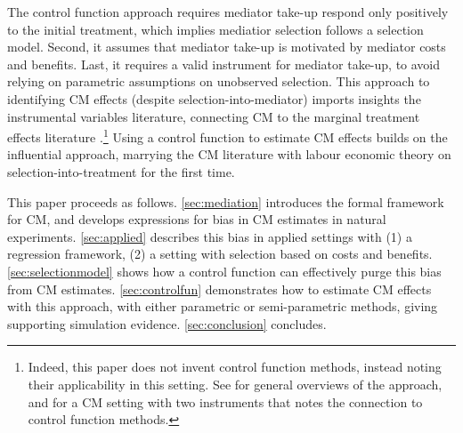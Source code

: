 The control function approach requires mediator take-up respond only positively to the initial treatment, which implies mediatior selection follows a selection model.
Second, it assumes that mediator take-up is motivated by mediator costs and benefits.
Last, it requires a valid instrument for mediator take-up, to avoid relying on parametric assumptions on unobserved selection.
This approach to identifying CM effects (despite selection-into-mediator) imports insights the instrumental variables literature, connecting CM to the marginal treatment effects literature \citep{vytlacil2002independence,heckman2004using,heckman2005structural,florens2008identification,kline2019heckits}.\footnote{
    Indeed, this paper does not invent control function methods, instead noting their applicability in this setting.
    See \cite{wooldridge2015control,imbens2007nonadditive} for general overviews of the approach, and \cite{frolich2017direct} for a CM setting with two instruments that notes the connection to control function methods.
}
Using a control function to estimate CM effects builds on the influential \cite{imai2010identification} approach, marrying the CM literature with labour economic theory on selection-into-treatment for the first time. 

This paper proceeds as follows.
\autoref{sec:mediation} introduces the formal framework for CM, and develops expressions for bias in CM estimates in natural experiments.
\autoref{sec:applied} describes this bias in applied settings with (1) a regression framework, (2) a setting with selection based on costs and benefits.
\autoref{sec:selectionmodel} shows how a control function can effectively purge this bias from CM estimates.
\autoref{sec:controlfun} demonstrates how to estimate CM effects with this approach, with either parametric or semi-parametric methods, giving supporting simulation evidence.
\autoref{sec:conclusion} concludes.
